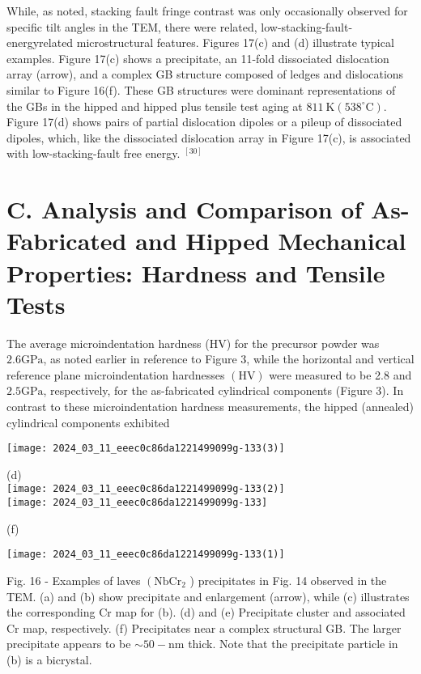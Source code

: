 \documentclass[10pt]{article}
\begin{document}
While, as noted, stacking fault fringe contrast was only occasionally observed for specific tilt angles in the TEM, there were related, low-stacking-fault-energyrelated microstructural features. Figures 17(c) and (d) illustrate typical examples. Figure 17(c) shows a precipitate, an 11-fold dissociated dislocation array (arrow), and a complex GB structure composed of ledges and dislocations similar to Figure 16(f). These GB structures were dominant representations of the GBs in the hipped and hipped plus tensile test aging at $811 \mathrm{~K}\left(538^{\circ} \mathrm{C}\right)$. Figure 17(d) shows pairs of partial dislocation dipoles or a pileup of dissociated dipoles, which, like the dissociated dislocation array in Figure 17(c), is associated with low-stacking-fault free energy. ${ }^{[30]}$

\section*{C. Analysis and Comparison of As-Fabricated and Hipped Mechanical Properties: Hardness and Tensile Tests}
The average microindentation hardness (HV) for the precursor powder was $2.6 \mathrm{GPa}$, as noted earlier in reference to Figure 3, while the horizontal and vertical reference plane microindentation hardnesses $(\mathrm{HV})$ were measured to be 2.8 and $2.5 \mathrm{GPa}$, respectively, for the as-fabricated cylindrical components (Figure 3). In contrast to these microindentation hardness measurements, the hipped (annealed) cylindrical components exhibited

\begin{center}
\texttt{[image: 2024\_03\_11\_eeec0c86da1221499099g-133(3)]}
\end{center}

(d)\\
\texttt{[image: 2024\_03\_11\_eeec0c86da1221499099g-133(2)]}\\
\texttt{[image: 2024\_03\_11\_eeec0c86da1221499099g-133]}

(f)

\begin{center}
\texttt{[image: 2024\_03\_11\_eeec0c86da1221499099g-133(1)]}
\end{center}

Fig. 16 - Examples of laves $\left(\mathrm{NbCr}_{2}\right.$ ) precipitates in Fig. 14 observed in the TEM. (a) and (b) show precipitate and enlargement (arrow), while (c) illustrates the corresponding $\mathrm{Cr}$ map for (b). (d) and (e) Precipitate cluster and associated $\mathrm{Cr}$ map, respectively. (f) Precipitates near a complex structural GB. The larger precipitate appears to be $\sim 50-\mathrm{nm}$ thick. Note that the precipitate particle in (b) is a bicrystal.
\end{document}
